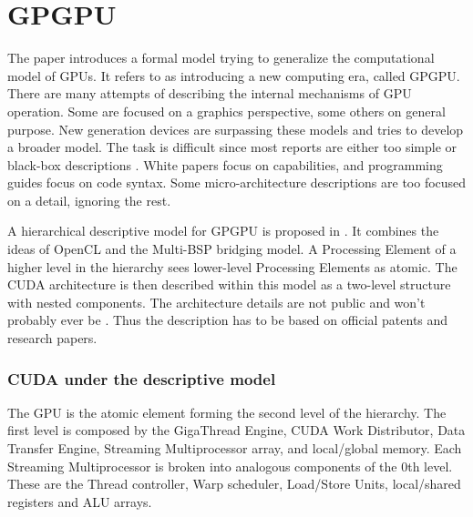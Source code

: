 
\section{GPGPU} \label{sec:gpgpu}


The paper \cite{Hu:2016:CLG:2891449.2873053} introduces a formal model trying to generalize the computational model of GPUs.
It refers to \cite{nickolls2010gpu} as introducing a new computing era, called GPGPU.
There are many attempts of describing the internal mechanisms of GPU operation.
Some are focused on a graphics perspective, some others on general purpose.
New generation devices are surpassing these models and \cite{Hu:2016:CLG:2891449.2873053} tries to develop a broader model.
The task is difficult since most reports are either too simple or black-box descriptions \cite{Hu:2016:CLG:2891449.2873053}.
White papers focus on capabilities, and programming guides focus on code syntax.
Some micro-architecture descriptions are too focused on a detail, ignoring the rest.

A hierarchical descriptive model for GPGPU is proposed in \cite{Hu:2016:CLG:2891449.2873053}.
It combines the ideas of OpenCL and the Multi-BSP \cite{valiant2008bridging} bridging model.
A Processing Element of a higher level in the hierarchy sees lower-level Processing Elements as atomic.
The CUDA architecture is then described within this model as a two-level structure with nested components.
The architecture details are not public and won't probably ever be \cite{voicu:fermi}.
Thus the description has to be based on official patents and research papers.

\subsubsection{CUDA under the descriptive model}
The GPU is the atomic element forming the second level of the hierarchy.
The first level is composed by the GigaThread Engine, CUDA Work Distributor, Data Transfer Engine, Streaming Multiprocessor array, and local/global memory.
Each Streaming Multiprocessor is broken into analogous components of the 0th level.
These are the Thread controller, Warp scheduler, Load/Store Units, local/shared registers and ALU arrays.

